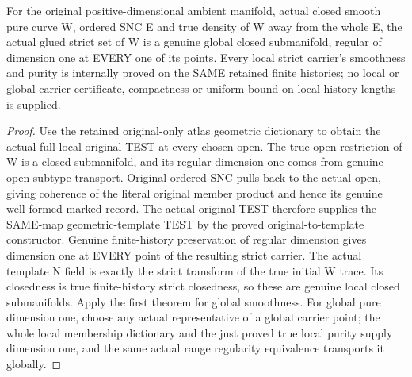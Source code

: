 \begin{theorem}
\label{hir:sharp-actual-original-global-pure-smooth-curve}
\leanok
For the original positive-dimensional ambient manifold, actual closed
smooth pure curve W, ordered SNC E and true density of W away from the
whole E, the actual glued strict set of W is a genuine global closed
submanifold, regular of dimension one at EVERY one of its points. Every
local strict carrier's smoothness and purity is internally proved on the
SAME retained finite histories; no local or global carrier certificate,
compactness or uniform bound on local history lengths is supplied.
\end{theorem}
\begin{proof}
Use the retained original-only atlas geometric dictionary to obtain the
actual full local original TEST at every chosen open. The true open
restriction of W is a closed submanifold, and its regular dimension one
comes from genuine open-subtype transport. Original ordered SNC pulls back
to the actual open, giving coherence of the literal original member product
and hence its genuine well-formed marked record. The actual original TEST
therefore supplies the SAME-map geometric-template TEST by the proved
original-to-template constructor. Genuine finite-history preservation of
regular dimension gives dimension one at EVERY point of the resulting
strict carrier. The actual template N field is exactly the strict transform
of the true initial W trace. Its closedness is true finite-history strict
closedness, so these are genuine local closed submanifolds. Apply the first
theorem for global smoothness. For global pure dimension one, choose any
actual representative of a global carrier point; the whole local membership
dictionary and the just proved true local purity supply dimension one, and
the same actual range regularity equivalence transports it globally.
\end{proof}

